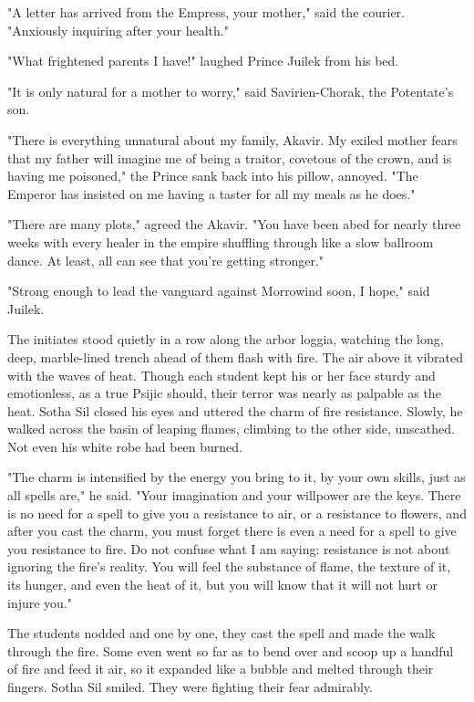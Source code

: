 "A letter has arrived from the Empress, your mother," said the courier. "Anxiously inquiring after your health."

"What frightened parents I have!" laughed Prince Juilek from his bed.

"It is only natural for a mother to worry," said Savirien-Chorak, the Potentate's son.

"There is everything unnatural about my family, Akavir. My exiled mother fears that my father will imagine me of being a traitor, covetous of the crown, and is having me poisoned," the Prince sank back into his pillow, annoyed. "The Emperor has insisted on me having a taster for all my meals as he does."

"There are many plots," agreed the Akavir. "You have been abed for nearly three weeks with every healer in the empire shuffling through like a slow ballroom dance. At least, all can see that you're getting stronger."

"Strong enough to lead the vanguard against Morrowind soon, I hope," said Juilek.

The initiates stood quietly in a row along the arbor loggia, watching the long, deep, marble-lined trench ahead of them flash with fire. The air above it vibrated with the waves of heat. Though each student kept his or her face sturdy and emotionless, as a true Psijic should, their terror was nearly as palpable as the heat. Sotha Sil closed his eyes and uttered the charm of fire resistance. Slowly, he walked across the basin of leaping flames, climbing to the other side, unscathed. Not even his white robe had been burned.

"The charm is intensified by the energy you bring to it, by your own skills, just as all spells are," he said. "Your imagination and your willpower are the keys. There is no need for a spell to give you a resistance to air, or a resistance to flowers, and after you cast the charm, you must forget there is even a need for a spell to give you resistance to fire. Do not confuse what I am saying: resistance is not about ignoring the fire's reality. You will feel the substance of flame, the texture of it, its hunger, and even the heat of it, but you will know that it will not hurt or injure you."

The students nodded and one by one, they cast the spell and made the walk through the fire. Some even went so far as to bend over and scoop up a handful of fire and feed it air, so it expanded like a bubble and melted through their fingers. Sotha Sil smiled. They were fighting their fear admirably.

